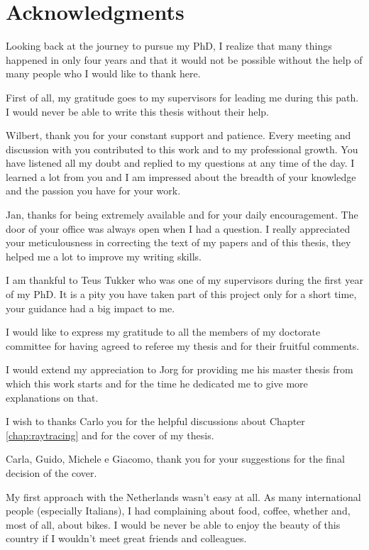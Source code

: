 \clearpage{\pagestyle{empty}\cleardoublepage}

\chapter*{Acknowledgments}
\markboth{}{}
Looking back at the journey to pursue my PhD, I realize that many things happened in only four years and that it would not be possible without the help of many people who I would like to thank here. 

First of all, my gratitude goes to my supervisors for leading me during this path. I would never be able to write this thesis without their help.

Wilbert, thank you for your constant support and patience. Every meeting and discussion with you contributed to this work and to my professional growth. 
You have listened all my doubt and replied to my questions at any time of the day.
I learned a lot from you and I am impressed about the breadth of your knowledge and the passion you have for your work. 

Jan, thanks for being extremely available and for your daily encouragement. The door of your office was always open when I had a question. 
I really appreciated your meticulousness in correcting the text of my papers and of this thesis, they helped me a lot to improve my writing skills.

I am thankful to Teus Tukker who was one of my supervisors during the first year of my PhD. It is a pity you have taken part of this project only for a short time, your guidance had a big impact to me.

I would like to express my gratitude to all the members of my doctorate committee for having agreed to referee my thesis and for their fruitful comments.  

I would extend my appreciation to Jorg for providing me his master thesis from which this work starts and for the time he dedicated me to give more explanations on that.

I wish to thanks Carlo you for the helpful discussions about Chapter \ref{chap:raytracing} and for the cover of my thesis. 

Carla, Guido, Michele e Giacomo, thank you for your suggestions for the final decision of the cover.

My first approach with the Netherlands wasn't easy at all. As many international people (especially Italians), I had complaining about food, coffee, whether and, most of all, about bikes. 
I would be never be able to enjoy the beauty of this country if I wouldn't meet great friends and colleagues.

